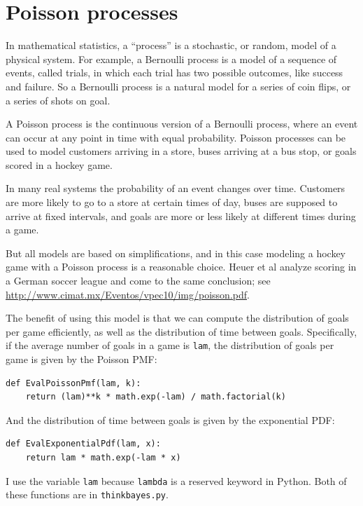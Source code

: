 \documentclass[12pt]{book}
\begin{document}
\section{Poisson processes}

In mathematical statistics, a ``process'' is a stochastic, or random,
model of a physical system.  For example, a Bernoulli process is a model
of a sequence of events, called trials, in which each trial has
two possible outcomes, like success and failure.  So a Bernoulli
process is a natural model for a series of coin flips, or a series
of shots on goal.

A Poisson process is the continuous version of a Bernoulli process,
where an event can occur at any point in time with equal probability.
Poisson processes can be used to model customers arriving in a store,
buses arriving at a bus stop, or goals scored in a hockey game.

In many real systems the probability of an event changes over time.
Customers are more likely to go to a store at certain times of day,
buses are supposed to arrive at fixed intervals, and goals are more
or less likely at different times during a game.

But all models are based on simplifications, and in this case modeling
a hockey game with a Poisson process is a reasonable choice.  Heuer
et al analyze scoring in a German soccer league and come to the same
conclusion; see
\url{http://www.cimat.mx/Eventos/vpec10/img/poisson.pdf}.

The benefit of using this model is that we can compute the distribution
of goals per game efficiently, as well as the distribution of time
between goals.  Specifically, if the average number of goals
in a game is {\tt lam}, the distribution of goals per game is
given by the Poisson PMF:

\begin{verbatim}
def EvalPoissonPmf(lam, k):
    return (lam)**k * math.exp(-lam) / math.factorial(k)
\end{verbatim}  

And the distribution of time between goals is given by the
exponential PDF:

\begin{verbatim}
def EvalExponentialPdf(lam, x):
    return lam * math.exp(-lam * x)
\end{verbatim}  

I use the variable
{\tt lam} because {\tt lambda} is a reserved keyword in Python.
Both of these functions are in \verb"thinkbayes.py".
\end{document}
